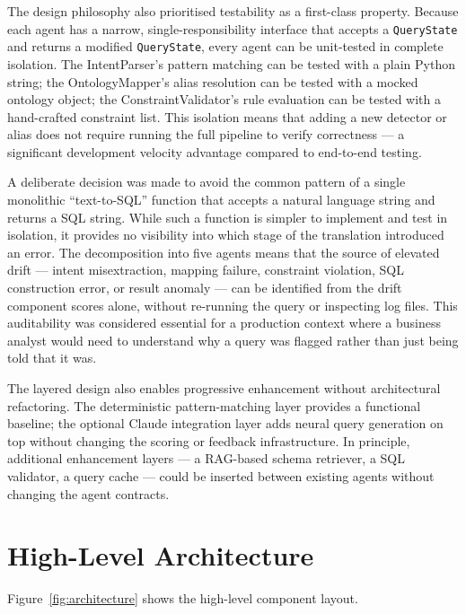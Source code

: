 \documentclass[12pt,a4paper]{report}
\begin{document}
The design philosophy also prioritised testability as a first-class property. Because each agent has a narrow, single-responsibility interface that accepts a \texttt{QueryState} and returns a modified \texttt{QueryState}, every agent can be unit-tested in complete isolation. The IntentParser's pattern matching can be tested with a plain Python string; the OntologyMapper's alias resolution can be tested with a mocked ontology object; the ConstraintValidator's rule evaluation can be tested with a hand-crafted constraint list. This isolation means that adding a new detector or alias does not require running the full pipeline to verify correctness — a significant development velocity advantage compared to end-to-end testing.

A deliberate decision was made to avoid the common pattern of a single monolithic ``text-to-SQL'' function that accepts a natural language string and returns a \ac{SQL} string. While such a function is simpler to implement and test in isolation, it provides no visibility into which stage of the translation introduced an error. The decomposition into five agents means that the source of elevated drift — intent misextraction, mapping failure, constraint violation, SQL construction error, or result anomaly — can be identified from the drift component scores alone, without re-running the query or inspecting log files. This auditability was considered essential for a production context where a business analyst would need to understand why a query was flagged rather than just being told that it was.

The layered design also enables progressive enhancement without architectural refactoring. The deterministic pattern-matching layer provides a functional baseline; the optional Claude integration layer adds neural query generation on top without changing the scoring or feedback infrastructure. In principle, additional enhancement layers — a RAG-based schema retriever, a SQL validator, a query cache — could be inserted between existing agents without changing the agent contracts.

\section{High-Level Architecture}
\label{sec:architecture}

Figure~\ref{fig:architecture} shows the high-level component layout.
\end{document}
